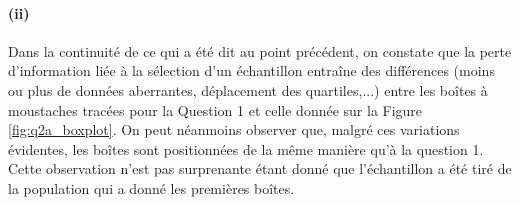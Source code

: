 \documentclass[a4paper,11pt]{article}
\begin{document}
\paragraph{(ii)} Dans la continuité de ce qui a été dit au point précédent, on constate que la perte d'information liée à la sélection d'un échantillon entraîne des différences (moins ou plus de données aberrantes, déplacement des quartiles,...) entre les boîtes à moustaches tracées pour la Question 1 et celle donnée sur la Figure \ref{fig:q2a_boxplot}. On peut néanmoins observer que, malgré ces variations évidentes, les boîtes sont positionnées de la même manière qu'à la question 1. Cette observation n'est pas surprenante étant donné que l'échantillon a été tiré de la population qui a donné les premières boîtes.

\begin{figure}[!h]
	\\

\end{figure}
\end{document}
